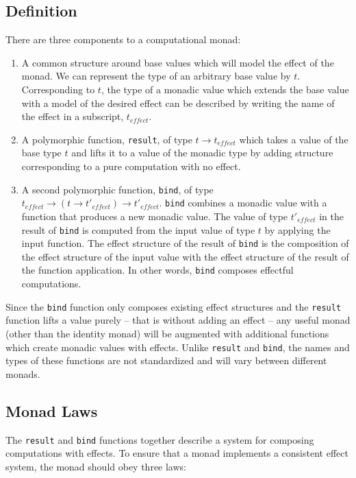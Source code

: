 \documentclass[natbib,10pt]{sigplanconf}
\begin{document}
\subsection{Definition}

There are three components to a computational monad:
\begin{enumerate}
\item
A common structure around base values which will model the
effect of the monad.  We can represent the type of an arbitrary
base value by $t$. Corresponding to $t$, the type of a monadic
value which extends the base value with a model of the desired
effect can be described by writing the name of the effect
in a subscript, $t_{effect}$.

\item
A polymorphic function, \texttt{result}, of type $t \rightarrow t_{effect}$
which takes a value of the base type $t$ and lifts it to a value of the
monadic type by adding structure corresponding to a pure computation
with no effect.

\item
A second polymorphic function, \texttt{bind}, of type
$t_{effect} \rightarrow (t \rightarrow t'_{effect}) \rightarrow t'_{effect}$.
\texttt{bind} combines a monadic value with a function that produces a new 
monadic value. The value of type $t'_{effect}$ in the result of \texttt{bind} 
is computed from the input value of type $t$ by applying the input function.  
The effect structure of the result of \texttt{bind} is the composition of 
the effect structure of the input value with the effect structure of the 
result of the function application. In other words, \texttt{bind} composes 
effectful computations.
\end{enumerate}

Since the \texttt{bind} function only composes existing effect structures
and the \texttt{result} function lifts a value purely -- that is without
adding an effect -- any useful monad (other than the identity monad)
will be augmented with additional functions which create monadic
values with effects.  Unlike \texttt{result} and \texttt{bind}, the names
and types of these functions are not standardized and will vary
between different monads.

\subsection{Monad Laws}

The \texttt{result} and \texttt{bind} functions together describe a system
for composing computations with effects.  To ensure that a monad
implements a consistent effect system, the monad should obey three laws:
\end{document}
